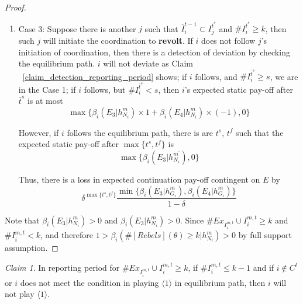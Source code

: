 \documentclass[12pt,letterpaper]{article}
\newtheorem*{main result}{Main Result}
\theoremstyle{definition}
\theoremstyle{remark}
\theoremstyle{claim}
\newtheorem{claim}{Claim}
\begin{document}
\begin{proof}
\begin{enumerate}
\item Case 3: Suppose there is another $j$ such that $\bar{I}^{t-1}_i\subset {I}^{\bar{t}^{s}}_j$ and $\# I^{\bar{t}^s}_i\geq k$, then such $j$ will initiate  the coordination to \textbf{revolt}. If $i$ does not follow $j$'s initiation of coordination, then there is a detection of deviation by checking the equilibrium path. $i$ will not deviate as Claim ~\ref{claim_detection_reporting_period} shows; if $i$ follows, and $\#I^{\bar{t}^s}_i\geq s$, we are in the Case 1; if $i$ follows, but $\#I^{\bar{t}^s}_i< s$, then $i$'s expected static pay-off after $\bar{t}^{s}$ is at most
\[
{\max\{\beta_{i}(E_3|h^{m}_{N_i})\times 1+\beta_{i}(E_4|h^{m}_{N_i})\times (-1), 0\}}
\]

However, if $i$ follows the equilibrium path, there is are $t^s$, $t^f$ such that the expected static pay-off after $\max\{t^s,t^f\}$ is
\[\max\{\beta_{i}(E_3|h^{m^{'}}_{N_i}),0\}\]

Thus, there is a loss in expected continuation pay-off contingent on $E$ by
\[\delta^{\max\{t^s,t^f\}}\frac{\min\{\beta_{i}(E_3|h^{m}_{G_i}),\beta_{i}(E_4|h^{m}_{G_i})\}}{1-\delta}\]
\end{enumerate}

Note that $\beta_{i}(E_3|h^{m}_{N_i})>0$ and $\beta_{i}(E_3|h^{m}_{N_i})>0$. Since $\#Ex_{I^{m,t}_i}\cup I^{m,t}_i\geq k$ and $\# I^{m,t}_i<k$, and therefore $1>\beta_{i}(\#[Rebels](\theta)\geq k|h^{m}_{N_i})>0$ by full support assumption.
\end{proof}



\begin{claim} 
\label{claim_can_not_pretend_almost_success}
In reporting period for $\#Ex_{I^{m,t}_i}\cup I^{m,t}_i\geq k$, if $\#I^{m,t}_i\leq k-1$ and if $i\notin C^t$ or $i$ does not meet the condition in playing $\langle 1 \rangle$ in equilibrium path, then $i$ will not play $\langle 1 \rangle$.
\end{claim}
\end{document}
